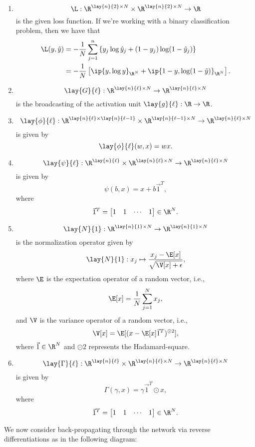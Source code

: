 \begin{enumerate}
	\item $$\L:\R^{\lay{n}{2}\times N}\times\R^{\lay{n}{2}\times N}\to\R$$
	is the given loss function.  If we're working with a binary classification problem, then we have that
	\begin{align*}
		\L(y,\hat{y})&=-\frac{1}{N}\sum_{j=1}^n\left\{y_j\log{\hat{y}_j}+(1-y_j)\log(1-\hat{y}_j)\right\}\\
		&=-\frac{1}{N}\left[\ip{y,\log{y}}_{\R^N}+\ip{1-y,\log(1-\hat{y})}_{\R^N}\right].
	\end{align*}
	
	\item $$\lay{G}{\ell}:\R^{\lay{n}{\ell}\times N}\to\R^{\lay{n}{\ell}\times N}$$
	is the broadcasting of the activation unit $\lay{g}{\ell}:\R\to\R$.
	
	\item $$\lay{\phi}{\ell}:\R^{\lay{n}{\ell}\times\lay{n}{\ell-1}}\times\R^{\lay{n}{\ell-1}\times N}\to\R^{\lay{n}{\ell}\times N}$$
	is given by
	$$\lay{\phi}{\ell}(w,x)=wx.$$
	
	\item $$\lay{\psi}{\ell}:\R^{\lay{n}{\ell}}\times\R^{\lay{n}{\ell}\times N}\to\R^{\lay{n}{\ell}\times N}$$
	is given by
	$$\psi(b,x)=x+b\vec{1}^T,$$
	where
	$$\vec{1}^T=\begin{bmatrix}
		1&1&\cdots&1
	\end{bmatrix}\in\R^N.$$
	
	\item $$\lay{N}{1}:\R^{\lay{n}{1}\times N}\to\R^{\lay{n}{1}\times N}$$
	is the normalization operator given by
	$$\lay{N}{1}:x_j\mapsto \frac{x_j-\E[x]}{\sqrt{\V[x]+\epsilon}},$$
	where $\E$ is the expectation operator of a random vector, i.e.,
	$$\E[x]=\frac{1}{N}\sum_{j=1}^Nx_j,$$
	and $\V$ is the variance operator of a random vector, i.e.,
	$$\V[x]=\E[(x-\E[x]\vec{1}^T)^{\odot2}],$$
	where $\vec{1}\in\R^N$ and $\odot2$ represents the Hadamard-square.
	
	\item $$\lay{\Gamma}{\ell}:\R^{\lay{n}{\ell}}\times\R^{\lay{n}{\ell}\times N}\to\R^{\lay{n}{\ell}\times N}$$
	is given by
	$$\Gamma(\gamma, x)=\gamma\vec{1}^T\odot x,$$
	where
	$$\vec{1}^T=\begin{bmatrix}
		1&1&\cdots&1
	\end{bmatrix}\in\R^N.$$
\end{enumerate}

We now consider back-propagating through the network via reverse differentiations as in the following diagram:


